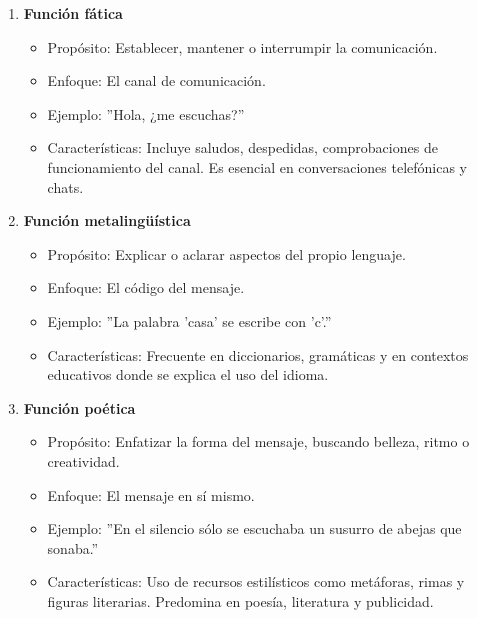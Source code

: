 \begin{enumerate}
      \item \textbf{Función fática}
            \begin{itemize}
                  \item Propósito: Establecer, mantener o interrumpir la comunicación.
                  \item Enfoque: El canal de comunicación.
                  \item Ejemplo: ''Hola, ¿me escuchas?''
                  \item Características: Incluye saludos, despedidas, comprobaciones de funcionamiento del canal. Es esencial en conversaciones telefónicas y chats.
            \end{itemize}

      \item \textbf{Función metalingüística}
            \begin{itemize}
                  \item Propósito: Explicar o aclarar aspectos del propio lenguaje.
                  \item Enfoque: El código del mensaje.
                  \item Ejemplo: ''La palabra 'casa' se escribe con 'c'.''
                  \item Características: Frecuente en diccionarios, gramáticas y en contextos educativos donde se explica el uso del idioma.
            \end{itemize}

      \item \textbf{Función poética}
            \begin{itemize}
                  \item Propósito: Enfatizar la forma del mensaje, buscando belleza, ritmo o creatividad.
                  \item Enfoque: El mensaje en sí mismo.
                  \item Ejemplo: ''En el silencio sólo se escuchaba un susurro de abejas que sonaba.''
                  \item Características: Uso de recursos estilísticos como metáforas, rimas y figuras literarias. Predomina en poesía, literatura y publicidad.
            \end{itemize}
\end{enumerate}


